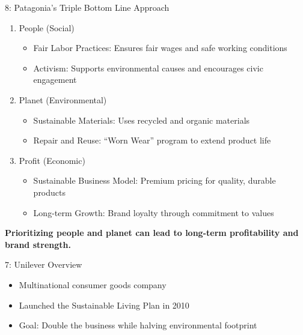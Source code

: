 \documentclass[
  ignorenonframetext,
]{beamer}
\providecommand{\tightlist}{%
  \setlength{\itemsep}{0pt}\setlength{\parskip}{0pt}}\usepackage{longtable,booktabs,array}
\begin{document}
\begin{frame}{8: Patagonia's Triple Bottom Line Approach}
\label{patagonias-triple-bottom-line-approach}
\begin{enumerate}
\tightlist
\item
  People (Social)

  \begin{itemize}
  \tightlist
  \item
    Fair Labor Practices: Ensures fair wages and safe working conditions
  \item
    Activism: Supports environmental causes and encourages civic
    engagement
  \end{itemize}
\item
  Planet (Environmental)

  \begin{itemize}
  \tightlist
  \item
    Sustainable Materials: Uses recycled and organic materials
  \item
    Repair and Reuse: ``Worn Wear'' program to extend product life
  \end{itemize}
\item
  Profit (Economic)

  \begin{itemize}
  \tightlist
  \item
    Sustainable Business Model: Premium pricing for quality, durable
    products
  \item
    Long-term Growth: Brand loyalty through commitment to values
  \end{itemize}
\end{enumerate}

\textbf{Prioritizing people and planet can lead to long-term
profitability and brand strength.}
\end{frame}

\begin{frame}{7: Unilever Overview}
\label{unilever-overview}
\begin{itemize}
\tightlist
\item
  Multinational consumer goods company
\item
  Launched the Sustainable Living Plan in 2010
\item
  Goal: Double the business while halving environmental footprint
\end{itemize}
\end{frame}
\end{document}
